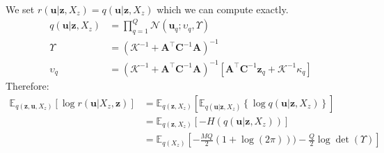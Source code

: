 \documentclass[12pt]{article}
\newcommand{\Kappa}{\mathcal{K}}
\newcommand{\ub}{\mathbf{u}}
\newcommand{\zb}{\mathbf{z}}
\newcommand{\Cb}{\mathbf{C}}
\newcommand{\Ab}{\mathbf{A}}
\newcommand{\Kuu}{\mathbf{K}_{uu}}
\newcommand{\Ex}{\mathbb{E}}
\begin{document}
%
We set $r(\ub|\zb,X_z) = q(\ub|\zb,X_z)$ which we can compute exactly.
%
\begin{align}
q(\ub|\zb,X_z) &= \prod_{q=1}^Q \mathcal{N}(\ub_q; \upsilon_q, \Upsilon) \\
\Upsilon &= (\Kappa^{-1} + \Ab^\top\Cb^{-1}\Ab)^{-1} \\
\upsilon_q &= (\Kappa^{-1} + \Ab^\top\Cb^{-1}\Ab)^{-1}[\Ab^\top \Cb^{-1}\zb_q + \Kappa^{-1}\kappa_q]
\end{align}
%
Therefore:
%
\begin{align}
\Ex_{q(\zb,\ub,X_z)}\left[\log r(\ub|X_z,\zb)\right] &= \Ex_{q(\zb,X_z)}\left[ \Ex_{q(\ub|\zb,X_z)} \left\{\log q(\ub|\zb,X_z) \right\} \right] \\
&= \Ex_{q(\zb,X_z)}\left[-H(q(\ub|\zb,X_z)) \right] \\
&= \Ex_{q(X_z)}\left[-\frac{MQ}{2}(1+\log(2\pi))) -\frac{Q}{2}\log\det(\Upsilon) \right]
\end{align}
%
\end{document}
